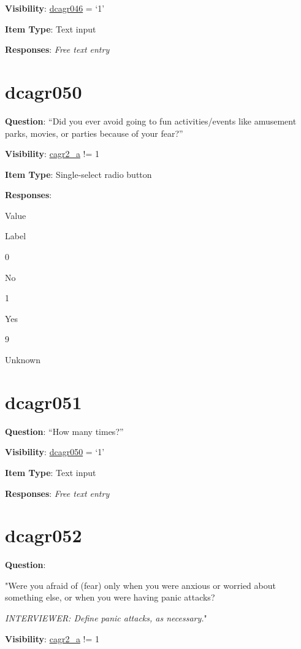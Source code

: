 \documentclass[]{book}
\begin{document}
\textbf{Visibility}: \protect\hyperlink{dcagr046}{dcagr046} = `1'

\textbf{Item Type}: Text input

\textbf{Responses}: \emph{Free text entry}

\hypertarget{dcagr050}{%
\section{dcagr050}\label{dcagr050}}

\textbf{Question}: ``Did you ever avoid going to fun activities/events like amusement parks, movies, or parties because of your fear?''

\textbf{Visibility}: \protect\hyperlink{cagr2_a}{cagr2\_a} != 1

\textbf{Item Type}: Single-select radio button

\textbf{Responses}:

Value

Label

0

No

1

Yes

9

Unknown

\hypertarget{dcagr051}{%
\section{dcagr051}\label{dcagr051}}

\textbf{Question}: ``How many times?''

\textbf{Visibility}: \protect\hyperlink{dcagr050}{dcagr050} = `1'

\textbf{Item Type}: Text input

\textbf{Responses}: \emph{Free text entry}

\hypertarget{dcagr052}{%
\section{dcagr052}\label{dcagr052}}

\textbf{Question}:

"Were you afraid of (fear) only when you were anxious or worried about something else, or when you were having panic attacks?

\emph{INTERVIEWER: Define panic attacks, as necessary.}"

\textbf{Visibility}: \protect\hyperlink{cagr2_a}{cagr2\_a} != 1
\end{document}
